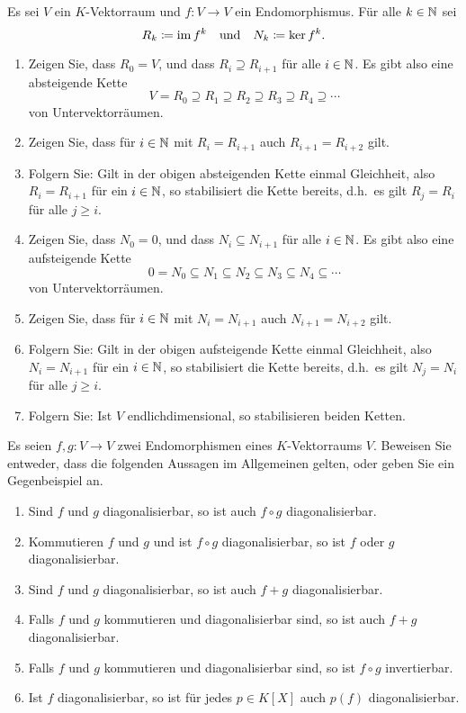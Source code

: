 \documentclass[a4paper,10pt]{scrartcl}
\begin{document}
\begin{question}
  Es sei $V$ ein $K$-Vektorraum und $f \colon V \to V$ ein Endomorphismus.
  Für alle $k \in \mathbb{N}$ sei
  \[
    R_k \coloneqq \operatorname{im} f^k
    \quad\text{und}\quad
    N_k \coloneqq \ker f^k.
  \]
  \begin{enumerate}[leftmargin=*]
    \item
      Zeigen Sie, dass $R_0 = V$, und dass $R_i \supseteq R_{i+1}$ für alle $i \in \mathbb{N}$.
      Es gibt also eine absteigende Kette
      \[
        V = R_0 \supseteq R_1 \supseteq R_2 \supseteq R_3 \supseteq R_4 \supseteq \dotsb
      \]
      von Untervektorräumen.
    \item
      Zeigen Sie, dass für $i \in \mathbb{N}$ mit $R_i = R_{i+1}$ auch $R_{i+1} = R_{i+2}$ gilt.
    \item
      Folgern Sie:
      Gilt in der obigen absteigenden Kette einmal Gleichheit, also $R_i = R_{i+1}$ für ein $i \in \mathbb{N}$, so stabilisiert die Kette bereits, d.h.\ es gilt $R_j = R_i$ für alle $j \geq i$.
    \item
      Zeigen Sie, dass $N_0 = 0$, und dass $N_i \subseteq N_{i+1}$ für alle $i \in \mathbb{N}$.
      Es gibt also eine aufsteigende Kette
      \[
        0 = N_0 \subseteq N_1 \subseteq N_2 \subseteq N_3 \subseteq N_4 \subseteq \dotsb
      \]
      von Untervektorräumen.
    \item
      Zeigen Sie, dass für $i \in \mathbb{N}$ mit $N_i = N_{i+1}$ auch $N_{i+1} = N_{i+2}$ gilt.
    \item
      Folgern Sie:
      Gilt in der obigen aufsteigende Kette einmal Gleichheit, also $N_i = N_{i+1}$ für ein $i \in \mathbb{N}$, so stabilisiert die Kette bereits, d.h.\ es gilt $N_j = N_i$ für alle $j \geq i$.
    \item
      Folgern Sie:
      Ist $V$ endlichdimensional, so stabilisieren beiden Ketten.
  \end{enumerate}
\end{question}


\begin{question}
  Es seien $f, g \colon V \to V$ zwei Endomorphismen eines $K$-Vektorraums $V$.
  Beweisen Sie entweder, dass die folgenden Aussagen im Allgemeinen gelten, oder geben Sie ein Gegenbeispiel an.
  \begin{enumerate}[leftmargin=*]
    \item
      Sind $f$ und $g$ diagonalisierbar, so ist auch $f \circ g$ diagonalisierbar.
    \item
      Kommutieren $f$ und $g$ und ist $f \circ g$ diagonalisierbar, so ist $f$ oder $g$ diagonalisierbar.
    \item
      Sind $f$ und $g$ diagonalisierbar, so ist auch $f + g$ diagonalisierbar.
    \item
      Falls $f$ und $g$ kommutieren und diagonalisierbar sind, so ist auch $f + g$ diagonalisierbar.
    \item
      Falls $f$ und $g$ kommutieren und diagonalisierbar sind, so ist $f \circ g$ invertierbar.
    \item
      Ist $f$ diagonalisierbar, so ist für jedes $p \in K[X]$ auch $p(f)$ diagonalisierbar.
  \end{enumerate}
\end{question}
\end{document}
